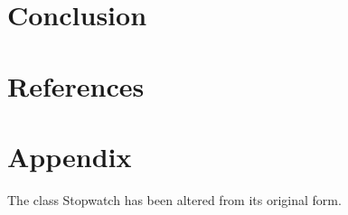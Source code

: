 \documentclass[onecolumn, 12pt, article]{IEEEtran}
\numberwithin{case}{problem}
\numberwithin{condition}{problem}
\numberwithin{condition}{subsection}
\numberwithin{definition}{section}
\theoremstyle{remark}
\numberwithin{question}{problem}
\theoremstyle{plain}
\numberwithin{answer}{problem}
\numberwithin{solution}{section}
\numberwithin{equation}{section}%
\begin{document}

\section{Conclusion}


\newpage

\section*{References}



\newpage

\section*{Appendix}




The class Stopwatch has been altered from its original form.
\newline




\end{document}
